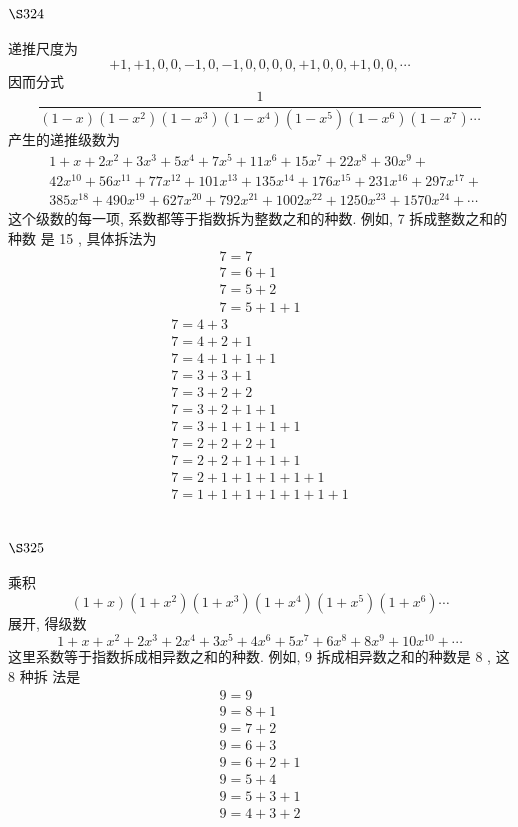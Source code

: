 \section{$\S 324$}

递推尺度为
\[
+1,+1,0,0,-1,0,-1,0,0,0,0,+1,0,0,+1,0,0, \cdots
\]
因而分式
\[
\frac{1}{(1-x)\left(1-x^{2}\right)\left(1-x^{3}\right)\left(1-x^{4}\right)\left(1-x^{5}\right)\left(1-x^{6}\right)\left(1-x^{7}\right) \cdots}
\]
产生的递推级数为
\[
\begin{aligned}
& 1+x+2 x^{2}+3 x^{3}+5 x^{4}+7 x^{5}+11 x^{6}+15 x^{7}+22 x^{8}+30 x^{9}+ \\
& 42 x^{10}+56 x^{11}+77 x^{12}+101 x^{13}+135 x^{14}+176 x^{15}+231 x^{16}+297 x^{17}+ \\
& 385 x^{18}+490 x^{19}+627 x^{20}+792 x^{21}+1002 x^{22}+1250 x^{23}+1570 x^{24}+\cdots
\end{aligned}
\]
这个级数的每一项, 系数都等于指数拆为整数之和的种数. 例如, 7 拆成整数之和的种数 是 15 , 具体拆法为
\[
\begin{gathered}
7=7 \\
7=6+1 \\
7=5+2 \\
7=5+1+1
\end{gathered}
\]
\[
\begin{gathered}
7=4+3 \\
7=4+2+1 \\
7=4+1+1+1 \\
7=3+3+1 \\
7=3+2+2 \\
7=3+2+1+1 \\
7=3+1+1+1+1 \\
7=2+2+2+1 \\
7=2+2+1+1+1 \\
7=2+1+1+1+1+1 \\
7=1+1+1+1+1+1+1
\end{gathered}
\]
\section{$\S 325$}

乘积
\[
(1+x)\left(1+x^{2}\right)\left(1+x^{3}\right)\left(1+x^{4}\right)\left(1+x^{5}\right)\left(1+x^{6}\right) \cdots
\]
展开, 得级数
\[
1+x+x^{2}+2 x^{3}+2 x^{4}+3 x^{5}+4 x^{6}+5 x^{7}+6 x^{8}+8 x^{9}+10 x^{10}+\cdots
\]
这里系数等于指数拆成相异数之和的种数. 例如, 9 拆成相异数之和的种数是 8 , 这 8 种拆 法是
\[
\begin{gathered}
9=9 \\
9=8+1 \\
9=7+2 \\
9=6+3 \\
9=6+2+1 \\
9=5+4 \\
9=5+3+1 \\
9=4+3+2
\end{gathered}
\]
